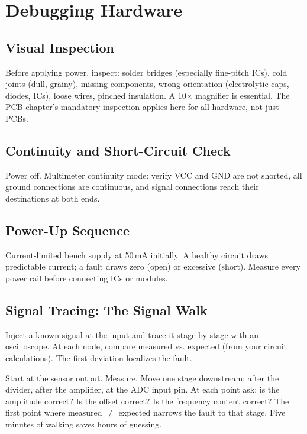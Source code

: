 \documentclass[11pt,letterpaper,twoside,openany]{book}
\begin{document}
\section{Debugging Hardware}

\subsection{Visual Inspection}
Before applying power, inspect: solder bridges (especially fine-pitch ICs), cold joints (dull, grainy), missing components, wrong orientation (electrolytic caps, diodes, ICs), loose wires, pinched insulation. A 10$\times$ magnifier is essential. The PCB chapter's mandatory inspection applies here for all hardware, not just PCBs.

\subsection{Continuity and Short-Circuit Check}
Power off. Multimeter continuity mode: verify VCC and GND are not shorted, all ground connections are continuous, and signal connections reach their destinations at both ends.

\subsection{Power-Up Sequence}
Current-limited bench supply at 50\,mA initially. A healthy circuit draws predictable current; a fault draws zero (open) or excessive (short). Measure every power rail before connecting ICs or modules.

\subsection{Signal Tracing: The Signal Walk}
Inject a known signal at the input and trace it stage by stage with an oscilloscope. At each node, compare measured vs. expected (from your circuit calculations). The first deviation localizes the fault.

\begin{tipbox}
Start at the sensor output. Measure. Move one stage downstream: after the divider, after the amplifier, at the ADC input pin. At each point ask: is the amplitude correct? Is the offset correct? Is the frequency content correct? The first point where measured $\neq$ expected narrows the fault to that stage. Five minutes of walking saves hours of guessing.
\end{tipbox}
\end{document}
